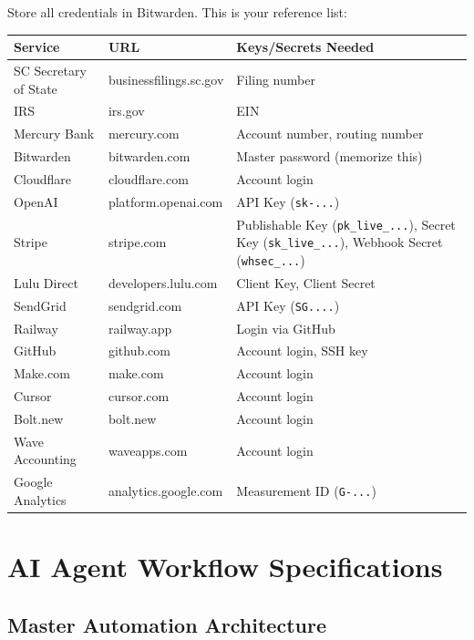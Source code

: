 \documentclass[12pt, letterpaper, oneside]{book}
\begin{document}
Store all credentials in Bitwarden. This is your reference list:

\begin{longtable}{p{1.5in}p{1.8in}p{2.2in}}
\toprule
\textbf{Service} & \textbf{URL} & \textbf{Keys/Secrets Needed} \\
\midrule
\endhead
SC Secretary of State & businessfilings.sc.gov & Filing number \\
IRS & irs.gov & EIN \\
Mercury Bank & mercury.com & Account number, routing number \\
Bitwarden & bitwarden.com & Master password (memorize this) \\
Cloudflare & cloudflare.com & Account login \\
OpenAI & platform.openai.com & API Key (\texttt{sk-...}) \\
Stripe & stripe.com & Publishable Key (\texttt{pk\_live\_...}), Secret Key (\texttt{sk\_live\_...}), Webhook Secret (\texttt{whsec\_...}) \\
Lulu Direct & developers.lulu.com & Client Key, Client Secret \\
SendGrid & sendgrid.com & API Key (\texttt{SG....}) \\
Railway & railway.app & Login via GitHub \\
GitHub & github.com & Account login, SSH key \\
Make.com & make.com & Account login \\
Cursor & cursor.com & Account login \\
Bolt.new & bolt.new & Account login \\
Wave Accounting & waveapps.com & Account login \\
Google Analytics & analytics.google.com & Measurement ID (\texttt{G-...}) \\
\bottomrule
\end{longtable}


\chapter{AI Agent Workflow Specifications}

\section{Master Automation Architecture}
\end{document}
